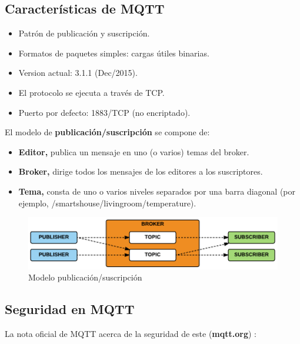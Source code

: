 {\subsection{Características de MQTT}

\begin{itemize}
    \item Patrón de publicación y suscripción.
    \item Formatos de paquetes simples: cargas útiles binarias.
    \item Version actual: 3.1.1 (Dec/2015).
    \item El protocolo se ejecuta a través de TCP.
    \item Puerto por defecto: 1883/TCP (no encriptado).
\end{itemize}


El modelo de \textbf{publicación/suscripción} se compone de:

\begin{itemize}
    \item \textbf{Editor,} publica un mensaje en uno (o varios) temas del broker.
    \item \textbf{Broker,} dirige todos los mensajes de los editores a los suscriptores.
    \item \textbf{Tema,} consta de uno o varios niveles separados por una barra diagonal (por ejemplo, /smartshouse/livingroom/temperature).
\end{itemize}

\begin{figure}[hb!]
    \centering
    \includegraphics[width=\linewidth]{imagenes/sub-pattern-mqtt.png}
    \caption{Modelo publicación/suscripción \cite{disenio-mqtt}}
    \label{fig:figure13-mqtt-analysis}
\end{figure}

\subsection{Seguridad en MQTT}

La nota oficial de MQTT acerca de la seguridad de este (\textbf{mqtt.org}) \cite{mqtt}: \\

}
